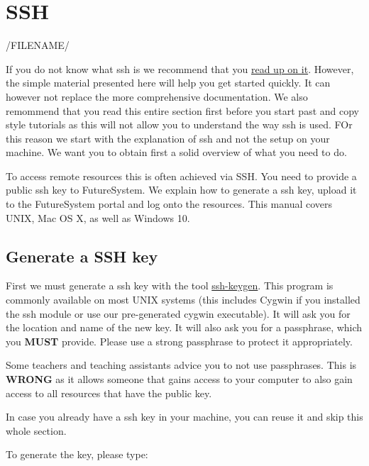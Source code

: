 \chapter{SSH}
\label{C:ssh}

/FILENAME/

If you do not know what ssh is we recommend that you
\href{http://openssh.com/manual.html}{read up on it}. However, the
simple material presented here will help you get started quickly. It
can however not replace the more comprehensive documentation. We also
remommend that you read this entire section first before you start
past and copy style tutorials as this will not allow you to understand
the way ssh is used. FOr this reason we start with the explanation of
ssh and not the setup on your machine. We want you to obtain first a
solid overview of what you need to do.

To access remote resources this is often achieved via SSH. You need to
provide a public ssh key to FutureSystem. We explain how to generate a
ssh key, upload it to the FutureSystem portal and log onto the
resources. This manual covers UNIX, Mac OS X, as well as Windows 10.



\section{Generate a SSH key}
\label{s:generate-a-ssh-key}

First we must generate a ssh key with the tool
\href{http://linux.die.net/man/1/ssh-keygen}{ssh-keygen}. This program
is commonly available on most UNIX systems (this includes Cygwin if
you installed the ssh module or use our pre-generated cygwin
executable). It will ask you for the location and name of the new
key. It will also ask you for a passphrase, which you \textbf{MUST}
provide. Please use a strong passphrase to protect it
appropriately.

\begin{WARNING}
  Some teachers and teaching assistants advice you to not use
  passphrases. This is \textbf{WRONG} as it allows someone that gains
  access to your computer to also gain access to all resources that
  have the public key.
\end{WARNING}

In case you already have a ssh key in your machine, you can reuse it and
skip this whole section.

To generate the key, please type:

